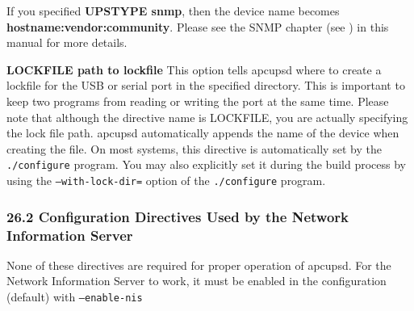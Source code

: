 \begin{description}
If you specified {\bf UPSTYPE snmp}, then the device name becomes {\bf
hostname:vendor:community}. Please see the SNMP chapter (see 
) in this
manual for more details.  

\item {\bf LOCKFILE \lt{}path to lockfile\gt{}}
This option tells apcupsd where to create a lockfile for the USB or serial
port in the specified directory. This is important to keep two programs from
reading or writing the port at the same time. Please note that although the
directive name is LOCKFILE, you are actually specifying the lock file path.
apcupsd automatically appends the name of the device when creating the file.
On most systems, this directive is automatically set by the {\tt ./configure}
program.  You may also explicitly set it during the build process by using the
{\tt --with-lock-dir=} option of the {\tt ./configure} program. 
\end{description}

\label{Configuration-Directives-Used-by-the-Network-Information-Server}

\subsubsection*{26.2 Configuration Directives Used by the Network Information
Server}

\label{index-Directives_002c-Network-241}
\label{index-Network-directives-242}
None of these directives are required for proper operation of apcupsd. For the
Network Information Server to work, it must be enabled in the configuration
(default) with {\tt --enable-nis}  


